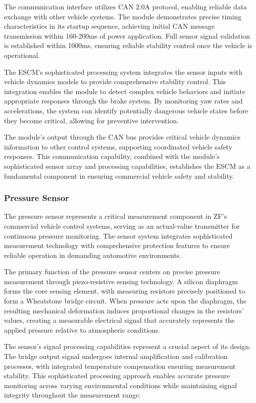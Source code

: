 \documentclass[12pt]{article}
\begin{document}
The communication interface utilizes CAN 2.0A protocol, enabling reliable data exchange with other vehicle systems. The module demonstrates precise timing characteristics in its startup sequence, achieving initial CAN message transmission within 160-200ms of power application. Full sensor signal validation is established within 1000ms, ensuring reliable stability control once the vehicle is operational.

The ESCM's sophisticated processing system integrates the sensor inputs with vehicle dynamics models to provide comprehensive stability control. This integration enables the module to detect complex vehicle behaviors and initiate appropriate responses through the brake system. By monitoring yaw rates and accelerations, the system can identify potentially dangerous vehicle states before they become critical, allowing for preventive intervention.

The module's output through the CAN bus provides critical vehicle dynamics information to other control systems, supporting coordinated vehicle safety responses. This communication capability, combined with the module's sophisticated sensor array and processing capabilities, establishes the ESCM as a fundamental component in ensuring commercial vehicle safety and stability.

\subsubsection{Pressure Sensor}

The pressure sensor represents a critical measurement component in ZF's
commercial vehicle control systems, serving as an actual-value transmitter for
continuous pressure monitoring. The sensor system integrates sophisticated
measurement technology with comprehensive protection features to ensure
reliable operation in demanding automotive environments.

The primary function of the pressure sensor centers on precise pressure
measurement through piezo-resistive sensing technology. A silicon diaphragm
forms the core sensing element, with measuring resistors precisely positioned
to form a Wheatstone bridge circuit. When pressure acts upon the diaphragm, the
resulting mechanical deformation induces proportional changes in the resistors'
values, creating a measurable electrical signal that accurately represents the
applied pressure relative to atmospheric conditions.

The sensor's signal processing capabilities represent a crucial aspect of its
design. The bridge output signal undergoes internal amplification and
calibration processes, with integrated temperature compensation ensuring
measurement stability. This sophisticated processing approach enables accurate
pressure monitoring across varying environmental conditions while maintaining
signal integrity throughout the measurement range.
\end{document}
